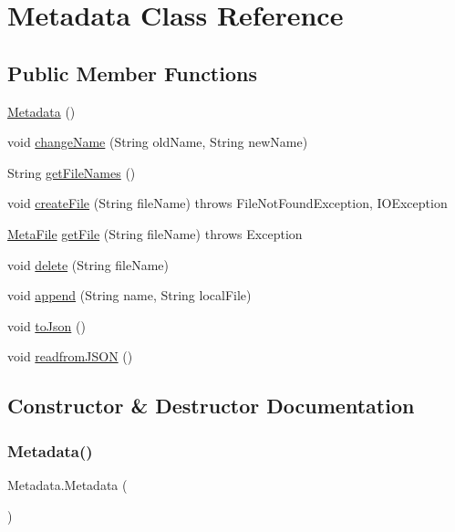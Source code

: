 \hypertarget{class_metadata}{}\section{Metadata Class Reference}
\label{class_metadata}
\subsection*{Public Member Functions}
\begin{DoxyCompactItemize}
\item 
\mbox{\hyperlink{class_metadata_a05084417d8815ec44e3d70126f31be00}{Metadata}} ()
\item 
void \mbox{\hyperlink{class_metadata_afba93e3d4b961ddcd67b5f2530a9e20d}{change\+Name}} (String old\+Name, String new\+Name)
\item 
String \mbox{\hyperlink{class_metadata_a47932985a21ca5fe3e99726b50c36658}{get\+File\+Names}} ()
\item 
void \mbox{\hyperlink{class_metadata_a67800e2f003cabb15744b86bec38a783}{create\+File}} (String file\+Name)  throws File\+Not\+Found\+Exception, I\+O\+Exception 
\item 
\mbox{\hyperlink{class_meta_file}{Meta\+File}} \mbox{\hyperlink{class_metadata_ae29cb4e7e73fdda5a3649e085863d481}{get\+File}} (String file\+Name)  throws Exception 
\item 
void \mbox{\hyperlink{class_metadata_a84c1111ef377e908c90bf9afb6006e20}{delete}} (String file\+Name)
\item 
void \mbox{\hyperlink{class_metadata_a84c55073051d681405262f85feed7286}{append}} (String name, String local\+File)
\item 
void \mbox{\hyperlink{class_metadata_ad553fd3bd0610354c55d603c64886533}{to\+Json}} ()
\item 
void \mbox{\hyperlink{class_metadata_ab22a1ff2f8390792d6c520be50dd3906}{readfrom\+J\+S\+ON}} ()
\end{DoxyCompactItemize}


\subsection{Constructor \& Destructor Documentation}
\mbox{\label{class_metadata_a05084417d8815ec44e3d70126f31be00}} 
\subsubsection{\texorpdfstring{Metadata()}{Metadata()}}
{\footnotesize\ttfamily Metadata.\+Metadata (\begin{DoxyParamCaption}{ }\end{DoxyParamCaption})\hspace{0.3cm}{\ttfamily [inline]}}

